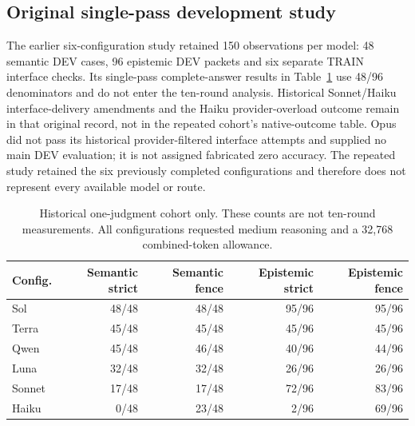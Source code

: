 \documentclass[a4paper,preprint,12pt,numbers,nopreprintline]{elsarticle}
\begin{document}
\subsection{Original single-pass development study}
The earlier six-configuration study retained 150 observations per model: 48 semantic DEV cases, 96 epistemic DEV packets and six separate TRAIN interface checks. Its single-pass complete-answer results in Table~\ref{tab:historical-single} use 48/96 denominators and do not enter the ten-round analysis. Historical Sonnet/Haiku interface-delivery amendments and the Haiku provider-overload outcome remain in that original record, not in the repeated cohort's native-outcome table. Opus did not pass its historical provider-filtered interface attempts and supplied no main DEV evaluation; it is not assigned fabricated zero accuracy. The repeated study retained the six previously completed configurations and therefore does not represent every available model or route.
\begin{table}[htbp]\centering\scriptsize
\caption{Historical one-judgment cohort only. These counts are not ten-round measurements. All configurations requested medium reasoning and a 32,768 combined-token allowance.}\label{tab:historical-single}
\setlength{\tabcolsep}{3pt}
\begin{tabular}{lrrrr}\toprule
Config. & Semantic strict & Semantic fence & Epistemic strict & Epistemic fence\\\midrule
Sol & 48/48 & 48/48 & 95/96 & 95/96\\
Terra & 45/48 & 45/48 & 45/96 & 45/96\\
Qwen & 45/48 & 46/48 & 40/96 & 44/96\\
Luna & 32/48 & 32/48 & 26/96 & 26/96\\
Sonnet & 17/48 & 17/48 & 72/96 & 83/96\\
Haiku & 0/48 & 23/48 & 2/96 & 69/96\\
\bottomrule\end{tabular}
\end{table}
\end{document}
